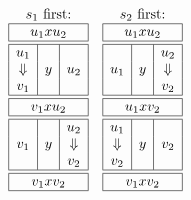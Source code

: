 \documentclass[../generics]{subfiles}
\begin{document}
\[
\begin{array}{cc}
\text{$s_1$ first:}&
\text{$s_2$ first:}\\
\begin{array}{|c|c|c|}
\hline
\multicolumn{3}{|c|}{u_1xu_2}\\
\hline
\hline
u_1&&\\
\Downarrow&y&u_2\\
v_1&&\\
\hline
\hline
\multicolumn{3}{|c|}{v_1xu_2}\\
\hline
\hline
&&u_2\\
v_1&y&\Downarrow\\
&&v_2\\
\hline
\hline
\multicolumn{3}{|c|}{v_1xv_2}\\
\hline
\end{array}
&
\begin{array}{|c|c|c|}
\hline
\multicolumn{3}{|c|}{u_1xu_2}\\
\hline
\hline
&&u_2\\
u_1&y&\Downarrow\\
&&v_2\\
\hline
\hline
\multicolumn{3}{|c|}{u_1xv_2}\\
\hline
\hline
u_1&&\\
\Downarrow&y&v_2\\
v_2&&\\
\hline
\hline
\multicolumn{3}{|c|}{v_1xv_2}\\
\hline
\end{array}
\end{array}
\]
\end{document}
